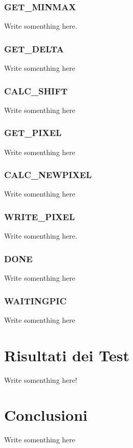 \documentclass[11pt, a4paper]{article}
\begin{document}
\subsubsection{GET\_MINMAX}
Write somenthing here.

\subsubsection{GET\_DELTA}
Write somenthing here

\subsubsection{CALC\_SHIFT}
Write somenthing here

\subsubsection{GET\_PIXEL}
Write somenthing here

\subsubsection{CALC\_NEWPIXEL}
Write somenthing here

\subsubsection{WRITE\_PIXEL}
Write somenthing here.

\subsubsection{DONE}
Write somenthing here

\subsubsection{WAITINGPIC}
Write somenthing here

\section{Risultati dei Test}
Write somenthing here!

\section{Conclusioni}
Write somenthing here
\end{document}
